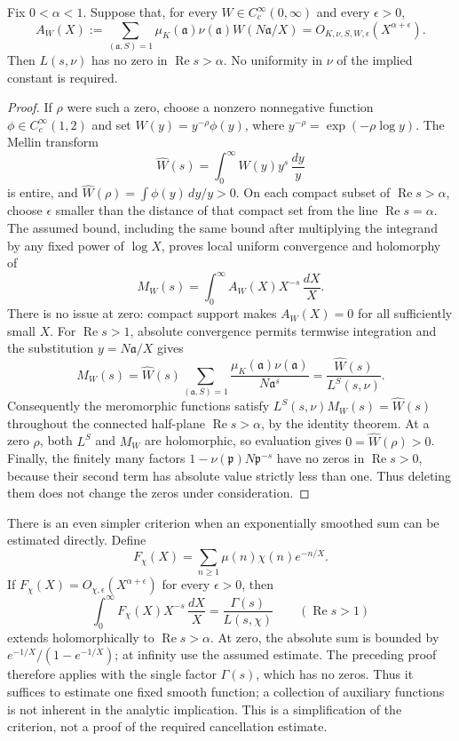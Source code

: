 \begin{proposition}
\label{prop:qrh-mellin}
Fix $0<\alpha<1$. Suppose that, for every
$W\in C_c^\infty(0,\infty)$ and every $\epsilon>0$,
\[
 A_W(X):=\sum_{(\mathfrak a,S)=1}
     \mu_K(\mathfrak a)\nu(\mathfrak a)
     W(N\mathfrak a/X)
       =O_{K,\nu,S,W,\epsilon}(X^{\alpha+\epsilon}).
\]
Then $L(s,\nu)$ has no zero in $\operatorname{Re}s>\alpha$.
No uniformity in $\nu$ of the implied constant is required.
\end{proposition}
\begin{proof}
If $\rho$ were such a zero, choose a nonzero nonnegative function
$\phi\in C_c^\infty(1,2)$ and set
$W(y)=y^{-\rho}\phi(y)$, where $y^{-\rho}=\exp(-\rho\log y)$.
The Mellin transform
\[
 \widehat W(s)=\int_0^\infty W(y)y^s\,\frac{dy}{y}
\]
is entire, and $\widehat W(\rho)=\int\phi(y)\,dy/y>0$.
On each compact subset of $\operatorname{Re}s>\alpha$, choose
$\epsilon$ smaller than the distance of that compact set from the
line $\operatorname{Re}s=\alpha$. The assumed bound, including the
same bound after multiplying the integrand by any fixed power of
$\log X$, proves local uniform convergence and holomorphy of
\[
 M_W(s)=\int_0^\infty A_W(X)X^{-s}\,\frac{dX}{X}.
\]
There is no issue at zero: compact support makes $A_W(X)=0$ for all
sufficiently small $X$. For $\operatorname{Re}s>1$, absolute
convergence permits termwise integration and the substitution
$y=N\mathfrak a/X$ gives
\[
 M_W(s)=\widehat W(s)
       \sum_{(\mathfrak a,S)=1}
        \frac{\mu_K(\mathfrak a)\nu(\mathfrak a)}{N\mathfrak a^s}
       =\frac{\widehat W(s)}{L^S(s,\nu)}.
\]
Consequently the meromorphic functions satisfy
$L^S(s,\nu)M_W(s)=\widehat W(s)$ throughout the connected
half-plane $\operatorname{Re}s>\alpha$, by the identity theorem.
At a zero $\rho$, both $L^S$ and $M_W$ are holomorphic, so evaluation
gives $0=\widehat W(\rho)>0$. Finally, the finitely many factors
$1-\nu(\mathfrak p)N\mathfrak p^{-s}$ have no zeros in
$\operatorname{Re}s>0$, because their second term has absolute
value strictly less than one. Thus deleting them does not change
the zeros under consideration.
\end{proof}

There is an even simpler criterion when an exponentially smoothed
sum can be estimated directly. Define
\[
 F_\chi(X)=\sum_{n\ge1}\mu(n)\chi(n)e^{-n/X}.
\]
If $F_\chi(X)=O_{\chi,\epsilon}(X^{\alpha+\epsilon})$ for every
$\epsilon>0$, then
\[
 \int_0^\infty F_\chi(X)X^{-s}\,\frac{dX}{X}
       =\frac{\Gamma(s)}{L(s,\chi)}
       \qquad(\operatorname{Re}s>1)
\]
extends holomorphically to $\operatorname{Re}s>\alpha$.
At zero, the absolute sum is bounded by
$e^{-1/X}/(1-e^{-1/X})$; at infinity use the assumed estimate.
The preceding proof therefore applies with the single factor
$\Gamma(s)$, which has no zeros. Thus it suffices to estimate one
fixed smooth function; a collection of auxiliary functions is not
inherent in the analytic implication. This is a simplification of
the criterion, not a proof of the required cancellation estimate.

